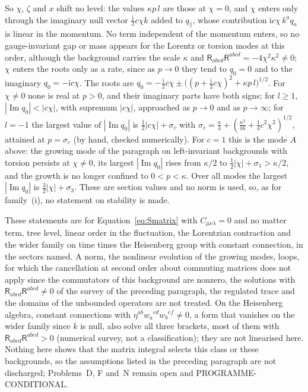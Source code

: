 So \(\chi\), \(\zeta\) and \(x\) shift no level: the values \(\kappa p\,l\) are those at \(\chi=0\), and \(\chi\) enters only through the imaginary null vector \(\tfrac{\mathrm i}2c\chi k\) added to \(q_\parallel\), whose contribution \(\mathrm ic\chi\,k^aq_a\) is linear in the momentum. No term independent of the momentum enters, so no gauge-invariant gap or mass appears for the Lorentz or torsion modes at this order, although the background carries the scale \(\kappa\) and \(\mathsf R_{abcd}\mathsf R^{abcd}=-4\chi^2\kappa^2\neq0\); \(\chi\) enters the roots only as a rate, since as \(p\to0\) they tend to \(q_0=0\) and to the imaginary \(q_0=-\mathrm ic\chi\). The roots are \(q_0=-\tfrac{\mathrm i}2c\chi\pm\bigl((p+\tfrac{\mathrm i}2c\chi)^2+\kappa p\,l\bigr)^{1/2}\). For \(\chi\neq0\) none is real at \(p>0\), and their imaginary parts have both signs; for \(l\ge1\), \(|\operatorname{Im}q_0|<|c\chi|\), with supremum \(|c\chi|\), approached as \(p\to0\) and as \(p\to\infty\); for \(l=-1\) the largest value of \(|\operatorname{Im}q_0|\) is \(\tfrac12|c\chi|+\sigma_c\) with \(\sigma_c=\tfrac\kappa4+(\tfrac{\kappa^2}{16}+\tfrac14c^2\chi^2)^{1/2}\), attained at \(p=\sigma_c\) (by hand, checked numerically). For \(c=1\) this is the mode \(A\) above: the growing mode of the paragraph on left-invariant backgrounds with torsion persists at \(\chi\neq0\), its largest \(|\operatorname{Im}q_0|\) rises from \(\kappa/2\) to \(\tfrac12|\chi|+\sigma_1>\kappa/2\), and the growth is no longer confined to \(0<p<\kappa\). Over all modes the largest \(|\operatorname{Im}q_0|\) is \(\tfrac32|\chi|+\sigma_3\). These are section values and no norm is used, so, as for family~(i), no statement on stability is made.

These statements are for Equation~\eqref{eq:Smatrix} with \(C_{\mu\nu\lambda}=0\) and no matter term, tree level, linear order in the fluctuation, the Lorentzian contraction and the wider family on time times the Heisenberg group with constant connection, in the sectors named. A norm, the nonlinear evolution of the growing modes, loops, for which the cancellation at second order about commuting matrices does not apply since the commutators of this background are nonzero, the solutions with \(\mathsf R_{abcd}\mathsf R^{abcd}\neq0\) of the survey of the preceding paragraph, the regulated trace and the domains of the unbounded operators are not treated. On the Heisenberg algebra, constant connections with \(\eta^{ab}w_a{}^{cd}w_b{}^{ef}\neq0\), a form that vanishes on the wider family since \(k\) is null, also solve all three brackets, most of them with \(\mathsf R_{abcd}\mathsf R^{abcd}>0\) (numerical survey, not a classification); they are not linearised here. Nothing here shows that the matrix integral selects this class or these backgrounds, so the assumptions listed in the preceding paragraph are not discharged; Problems~D, F and~N remain open and PROGRAMME-CONDITIONAL.
